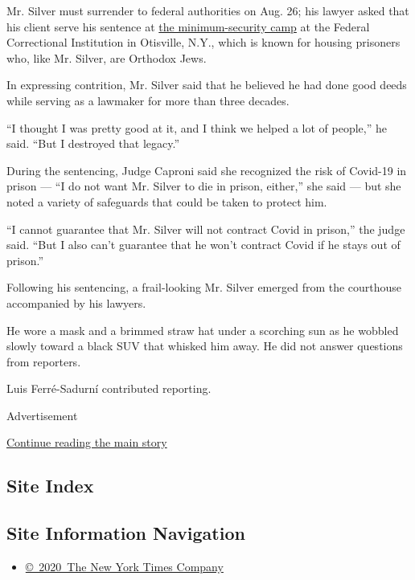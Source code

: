 Mr. Silver must surrender to federal authorities on Aug. 26; his lawyer
asked that his client serve his sentence at
\href{https://www.nytimes3xbfgragh.onion/2019/01/22/nyregion/michael-cohen-otisville-prison.html}{the
minimum-security camp} at the Federal Correctional Institution in
Otisville, N.Y., which is known for housing prisoners who, like Mr.
Silver, are Orthodox Jews.

In expressing contrition, Mr. Silver said that he believed he had done
good deeds while serving as a lawmaker for more than three decades.

``I thought I was pretty good at it, and I think we helped a lot of
people,'' he said. ``But I destroyed that legacy.''

During the sentencing, Judge Caproni said she recognized the risk of
Covid-19 in prison --- ``I do not want Mr. Silver to die in prison,
either,'' she said --- but she noted a variety of safeguards that could
be taken to protect him.

``I cannot guarantee that Mr. Silver will not contract Covid in
prison,'' the judge said. ``But I also can't guarantee that he won't
contract Covid if he stays out of prison.''

Following his sentencing, a frail-looking Mr. Silver emerged from the
courthouse accompanied by his lawyers.

He wore a mask and a brimmed straw hat under a scorching sun as he
wobbled slowly toward a black SUV that whisked him away. He did not
answer questions from reporters.

Luis Ferré-Sadurní contributed reporting.

Advertisement

\protect\hyperlink{after-bottom}{Continue reading the main story}

\hypertarget{site-index}{%
\subsection{Site Index}\label{site-index}}

\hypertarget{site-information-navigation}{%
\subsection{Site Information
Navigation}\label{site-information-navigation}}

\begin{itemize}
\tightlist
\item
  \href{https://help.nytimes3xbfgragh.onion/hc/en-us/articles/115014792127-Copyright-notice}{©~2020~The
  New York Times Company}
\end{itemize}

